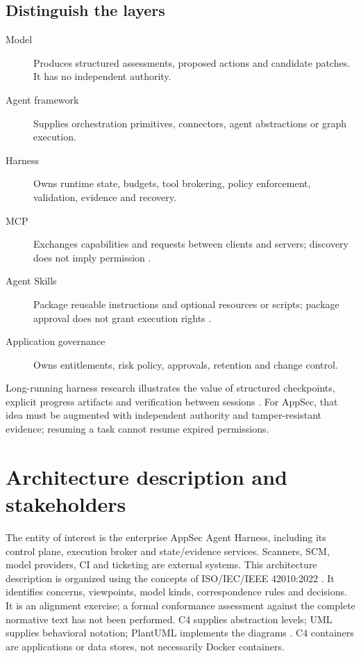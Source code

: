 \documentclass[11pt,letterpaper]{article}
\begin{document}
\subsection{Distinguish the layers}
\begin{description}
\item[Model] Produces structured assessments, proposed actions and candidate patches. It has no independent authority.
\item[Agent framework] Supplies orchestration primitives, connectors, agent abstractions or graph execution.
\item[Harness] Owns runtime state, budgets, tool brokering, policy enforcement, validation, evidence and recovery.
\item[MCP] Exchanges capabilities and requests between clients and servers; discovery does not imply permission \cite{mcp}.
\item[Agent Skills] Package reusable instructions and optional resources or scripts; package approval does not grant execution rights \cite{skills}.
\item[Application governance] Owns entitlements, risk policy, approvals, retention and change control.
\end{description}
Long-running harness research illustrates the value of structured checkpoints, explicit progress artifacts and verification between sessions \cite{anthropic}. For AppSec, that idea must be augmented with independent authority and tamper-resistant evidence; resuming a task cannot resume expired permissions.

\section{Architecture description and stakeholders}
The entity of interest is the enterprise AppSec Agent Harness, including its control plane, execution broker and state/evidence services. Scanners, SCM, model providers, CI and ticketing are external systems. This architecture description is organized using the concepts of ISO/IEC/IEEE 42010:2022 \cite{iso}. It identifies concerns, viewpoints, model kinds, correspondence rules and decisions. It is an alignment exercise; a formal conformance assessment against the complete normative text has not been performed. C4 supplies abstraction levels; UML supplies behavioral notation; PlantUML implements the diagrams \cite{c4}. C4 containers are applications or data stores, not necessarily Docker containers.
\end{document}
